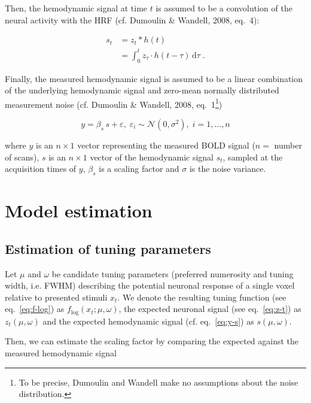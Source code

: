 \documentclass[a4paper,12pt]{article}
\begin{document}
Then, the hemodynamic signal at time $t$ is assumed to be a convolution of the neural activity with the HRF (cf. Dumoulin \& Wandell, 2008, eq.~4):

\begin{equation} \label{eq:s-t}
\begin{split}
s_t &= z_t \ast h(t) \\
&= \int_{0}^{t} z_\tau \cdot h(t-\tau) \, \mathrm{d}\tau \; .
\end{split}
\end{equation}

Finally, the measured hemodynamic signal is assumed to be a linear combination of the underlying hemodynamic signal and zero-mean normally distributed measurement noise (cf. Dumoulin \& Wandell, 2008, eq.~1\footnote{To be precise, Dumoulin and Wandell make no assumptions about the noise distribution.})

\begin{equation} \label{eq:y-s}
y = \beta_s \, s + \varepsilon, \; \varepsilon_i \sim \mathcal{N}(0, \sigma^2), \; i = 1,\ldots,n
\end{equation}

where $y$ is an $n \times 1$ vector representing the measured BOLD signal ($n =$ number of scans), $s$ is an $n \times 1$ vector of the hemodynamic signal $s_t$, sampled at the acquisition times of $y$, $\beta_s$ is a scaling factor and $\sigma$ is the noise variance.


\pagebreak
\section{Model estimation} \label{sec:Est}

\subsection{Estimation of tuning parameters}

Let $\mu$ and $\omega$ be candidate tuning parameters (preferred numerosity and tuning width, i.e. FWHM) describing the potential neuronal response of a single voxel relative to presented stimuli $x_t$. We denote the resulting tuning function (see eq.~\ref{eq:f-log}) as $f_\mathrm{log}(x_t; \mu, \omega)$, the expected neuronal signal (see eq.~\ref{eq:z-t}) as $z_t(\mu,\omega)$ and the expected hemodynamic signal (cf. eq.~\ref{eq:y-s}) as $s(\mu,\omega)$.

Then, we can estimate the scaling factor by comparing the expected against the measured hemodynamic signal
\end{document}
